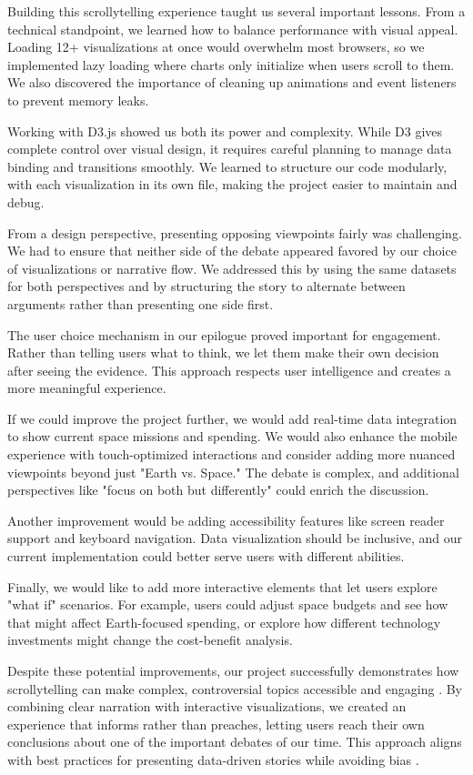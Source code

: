 \documentclass[sigconf]{acmart}
\begin{document}
Building this scrollytelling experience taught us several important lessons. From a technical standpoint, we learned how to balance performance with visual appeal. Loading 12+ visualizations at once would overwhelm most browsers, so we implemented lazy loading where charts only initialize when users scroll to them. We also discovered the importance of cleaning up animations and event listeners to prevent memory leaks.

Working with D3.js showed us both its power and complexity. While D3 gives complete control over visual design, it requires careful planning to manage data binding and transitions smoothly. We learned to structure our code modularly, with each visualization in its own file, making the project easier to maintain and debug.

From a design perspective, presenting opposing viewpoints fairly was challenging. We had to ensure that neither side of the debate appeared favored by our choice of visualizations or narrative flow. We addressed this by using the same datasets for both perspectives and by structuring the story to alternate between arguments rather than presenting one side first.

The user choice mechanism in our epilogue proved important for engagement. Rather than telling users what to think, we let them make their own decision after seeing the evidence. This approach respects user intelligence and creates a more meaningful experience.

If we could improve the project further, we would add real-time data integration to show current space missions and spending. We would also enhance the mobile experience with touch-optimized interactions and consider adding more nuanced viewpoints beyond just "Earth vs. Space." The debate is complex, and additional perspectives like "focus on both but differently" could enrich the discussion.

Another improvement would be adding accessibility features like screen reader support and keyboard navigation. Data visualization should be inclusive, and our current implementation could better serve users with different abilities.

Finally, we would like to add more interactive elements that let users explore "what if" scenarios. For example, users could adjust space budgets and see how that might affect Earth-focused spending, or explore how different technology investments might change the cost-benefit analysis.

Despite these potential improvements, our project successfully demonstrates how scrollytelling can make complex, controversial topics accessible and engaging \cite{ScrollyVis2022}. By combining clear narration with interactive visualizations, we created an experience that informs rather than preaches, letting users reach their own conclusions about one of the important debates of our time. This approach aligns with best practices for presenting data-driven stories while avoiding bias \cite{Cairo2016}.
\end{document}
